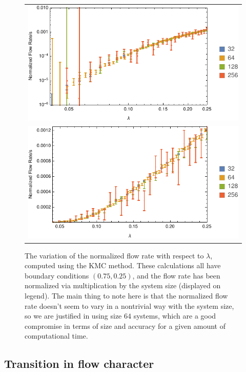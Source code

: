 \documentclass[
reprint, amsmath,amssymb,
]{revtex4-1}
\begin{document}
\begin{figure}[h!]
\vspace{0em}
\begin{center}
 \begin{tabular}{c}
    \includegraphics[width=1\linewidth]{lambdaScanRepeatFlows} \\
    \includegraphics[width=1\linewidth]{lambdaScanRepeatFlowsLin}
    \end{tabular}
\end{center}
\caption{\label{fig:sysScaling} The variation of the normalized  flow rate with respect to $\lambda$, computed using the KMC method. These calculations all have boundary conditions $(0.75, 0.25)$, and the flow rate has been
normalized via multiplication by the system size (displayed on legend). The main thing to note here is that the normalized flow rate doesn't seem to vary in a nontrivial way with the system size, so we are justified in using size
$64$ systems, which are a good compromise in terms of size and accuracy for a given amount of computational time.
}
\end{figure}

\subsection{Transition in flow character}
\end{document}
